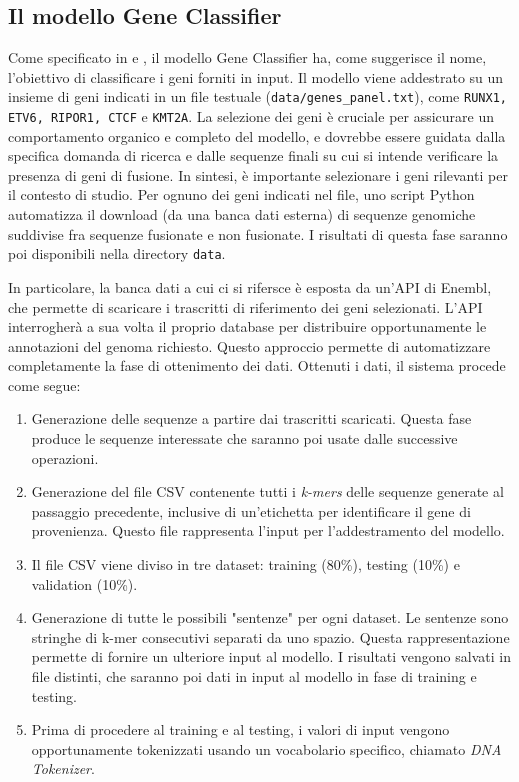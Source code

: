 \subsection{Il modello Gene Classifier}

Come specificato in \cite{cirillo} e \cite{desimone}, il modello Gene Classifier ha, come suggerisce il nome, l'obiettivo di classificare i geni forniti in input. Il modello viene addestrato su un insieme di geni  indicati in un file testuale ({\small \verb|data/genes_panel.txt|}), come {\small \verb|RUNX1, ETV6, RIPOR1, CTCF|} e {\small \verb|KMT2A|}. La selezione dei geni è cruciale per assicurare un comportamento organico e completo del modello, e dovrebbe essere guidata dalla specifica domanda di ricerca e dalle sequenze finali su cui si intende verificare la presenza di geni di fusione. In sintesi, è importante selezionare i geni rilevanti per il contesto di studio. Per ognuno dei geni indicati nel file, uno script Python automatizza il download (da una banca dati esterna) di sequenze genomiche suddivise fra sequenze fusionate e non fusionate. I risultati di questa fase saranno poi disponibili nella directory {\small \verb|data|}.

In particolare, la banca dati a cui ci si rifersce è esposta da un'API di Enembl, che permette di scaricare i trascritti di riferimento dei geni selezionati. L'API interrogherà a sua volta il proprio database per distribuire opportunamente le annotazioni del genoma richiesto. Questo approccio permette di automatizzare completamente la fase di ottenimento dei dati. Ottenuti i dati, il sistema procede come segue:

\begin{enumerate}
    \item Generazione delle sequenze a partire dai trascritti scaricati. Questa fase produce le sequenze interessate che saranno poi usate dalle successive operazioni.
    \item Generazione del file CSV contenente tutti i {\em k-mers} delle sequenze generate al passaggio precedente, inclusive di un'etichetta per identificare il gene di provenienza. Questo file rappresenta l'input per l'addestramento del modello.
    \item Il file CSV viene diviso in tre dataset: training (80\%), testing (10\%) e validation (10\%).
    \item Generazione di tutte le possibili "sentenze" per ogni dataset. Le sentenze sono stringhe di k-mer consecutivi separati da uno spazio. Questa rappresentazione permette di fornire un ulteriore input al modello. I risultati vengono salvati in file distinti, che saranno poi dati in input al modello in fase di training e testing.
    \item Prima di procedere al training e al testing, i valori di input vengono opportunamente tokenizzati usando un vocabolario specifico, chiamato {\em DNA Tokenizer}.
\end{enumerate}

